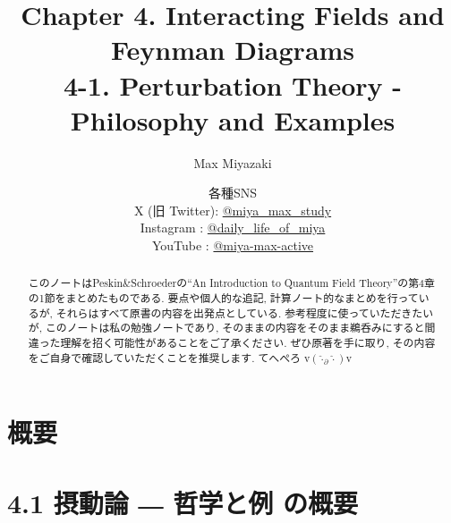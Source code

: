 \documentclass[a4paper,12pt]{article}
\title{Chapter 4. Interacting Fields and Feynman Diagrams\\
4-1. Perturbation Theory - Philosophy and Examples}
\date{各種SNS\\
    X (旧 Twitter): \href{https://x.com/miya_max_study}{@miya\_max\_study}\\
    Instagram : \href{https://www.instagram.com/daily_life_of_miya/}{@daily\_life\_of\_miya}\\
    YouTube : \href{https://www.youtube.com/@miya-max-active}{@miya-max-active}
    }
\author{Max Miyazaki}
\begin{document}
\maketitle

\vspace{1cm}
\begin{abstract}
    このノートはPeskin\&Schroederの``An Introduction to Quantum Field Theory''の第4章の1節をまとめたものである. 要点や個人的な追記, 計算ノート的なまとめを行っているが, それらはすべて原書の内容を出発点としている. 参考程度に使っていただきたいが, このノートは私の勉強ノートであり, そのままの内容をそのまま鵜呑みにすると間違った理解を招く可能性があることをご了承ください. ぜひ原著を手に取り, その内容をご自身で確認していただくことを推奨します. てへぺろ v$({\hat{\cdot}_\partial \hat{\cdot}})$v
\end{abstract}
    
    

\newpage
\color{blue}
\section*{概要}
\section*{4.1 摂動論 ― 哲学と例 の概要}
\end{document}
